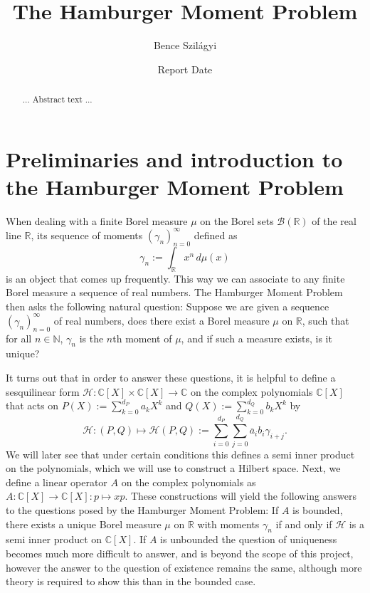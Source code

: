 \documentclass[12pt,oneside]{report}
\title{The Hamburger Moment Problem}
\date{Report Date}
\author{Bence Szilágyi}
\begin{document}
\newcommand{\Ran}{\mathrm{Ran}}
\newcommand{\supp}{\mathrm{supp}}
\newcommand{\spanrm}{\mathrm{span}}
\newcommand{\id}{\mathrm{id}}

\maketitle

\begin{abstract} ... Abstract text ... \end{abstract}
\declaration
\dedication{}

\tableofcontents
{}
\newpage
{}


\chapter{Preliminaries and introduction to the Hamburger Moment Problem}

When dealing with a finite Borel measure $\mu$ on the Borel sets $\mathcal{B}(\mathbb{R})$ of the real line $\mathbb{R}$, its sequence of moments $(\gamma_{n})_{n=0}^{\infty}$ defined as $$
\gamma_{n} := \int _{\mathbb{R}} x^{n} \, d\mu(x)
$$is an object that comes up frequently. This way we can associate to any finite Borel measure a sequence of real numbers. The Hamburger Moment Problem then asks the following natural question: Suppose we are given a sequence $(\gamma_{n})_{n=0}^{\infty}$ of real numbers, does there exist a Borel measure $\mu$ on $\mathbb{R}$, such that for all $n \in \mathbb{N}$, $\gamma_{n}$ is the $n$th moment of $\mu$, and if such a measure exists, is it unique?

It turns out that in order to answer these questions, it is helpful to define a sesquilinear form $\mathcal{H}: \mathbb{C}[X] \times \mathbb{C}[X] \to \mathbb{C}$ on the complex polynomials $\mathbb{C}[X]$ that acts on $P(X) := \sum_{k=0}^{d_{P}}a_{k}X^{k}$ and $Q(X) := \sum_{k=0}^{d_{Q}}b_{k}X^{k}$ by
$$\mathcal{H}: (P, Q) \mapsto \mathcal{H}(P,Q) := \sum_{i = 0}^{d_{P}} \sum_{j = 0}^{d_{Q}} \overline{a}_{i}b_{i}\gamma_{i+j}.$$
We will later see that under certain conditions this defines a semi inner product on the polynomials, which we will use to construct a Hilbert space. Next, we define a linear operator $A$ on the complex polynomials as $A: \mathbb{C}[X] \to \mathbb{C}[X]: p \mapsto xp$. These constructions will yield the following answers to the questions posed by the Hamburger Moment Problem: If $A$ is bounded, there exists a unique Borel measure $\mu$ on $\mathbb{R}$ with moments $\gamma_{n}$ if and only if $\mathcal{H}$ is a semi inner product on $\mathbb{C}[X]$. If $A$ is unbounded the question of uniqueness becomes much more difficult to answer, and is beyond the scope of this project, however the answer to the question of existence remains the same, although more theory is required to show this than in the bounded case.
\end{document}

